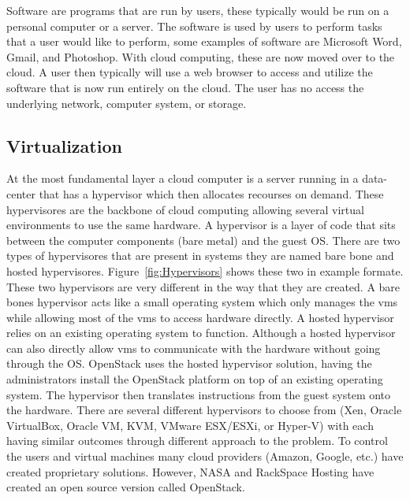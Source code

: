 \documentclass[12pt]{article}
\begin{document}
\begin{itemize}
        Software are programs that are run by users, these typically would be run on a personal computer or a server. The software is used by users to perform tasks that a user would like to perform, some examples of software are Microsoft Word, Gmail, and Photoshop. With cloud computing, these are now moved over to the cloud. A user then typically will use a web browser to access and utilize the software that is now run entirely on the cloud. The user has no access the underlying network, computer system, or storage.

\end{itemize}

\subsection{Virtualization}
At the most fundamental layer a cloud computer is a server running in a data-center that has a hypervisor which then allocates recourses on demand. These hypervisores are the backbone of cloud computing allowing several virtual environments to use the same hardware. A hypervisor is a layer of code that sits between the computer components (bare metal) and the guest OS\@. There are two types of hypervisores that are present in systems they are named bare bone and hosted hypervisores. Figure~\ref{fig:Hypervisors} shows these two in example formate. These two hypervisors are very different in the way that they are created.  A bare bones hypervisor acts like a small operating system which only manages the vms while allowing most of the vms to access hardware directly. A hosted hypervisor relies on an existing operating system to function. Although a hosted hypervisor can also directly allow vms to communicate with the hardware without going through the OS\@. OpenStack uses the hosted hypervisor solution, having the administrators install the OpenStack platform on top of an existing operating system. The hypervisor then translates instructions from the guest system onto the hardware. There are several different hypervisors to choose from (Xen, Oracle VirtualBox, Oracle VM, KVM, VMware ESX/ESXi, or Hyper-V) with each having similar outcomes through different approach to the problem. To control the users and virtual machines many cloud providers (Amazon, Google, etc.) have created proprietary solutions. However, NASA and RackSpace Hosting \cite{wikipedia1} have created an open source version called OpenStack.
\end{document}
